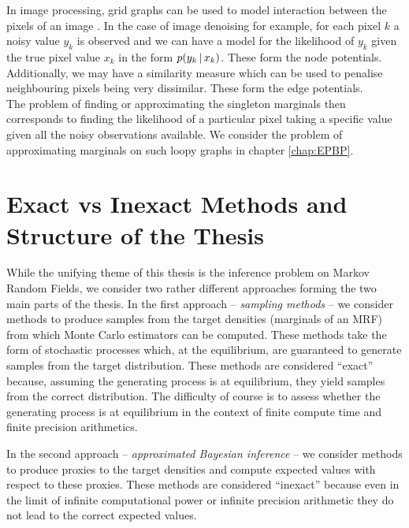In image processing, grid graphs can be used to model interaction between the pixels of an image  \citep{blake11}. 
In the case of image denoising for example, for each pixel $k$ a noisy value $y_k$ is observed and we can have a model for the likelihood of $y_k$ given the true pixel value $x_k$ in the form $p(y_k\,|\, x_k)$. These  form the node potentials. 
Additionally, we may have a similarity measure which can be used to penalise neighbouring pixels being very dissimilar. These form the edge potentials.\\
The problem of finding or approximating the singleton marginals then corresponds to finding the likelihood of a particular pixel taking a specific value given all the noisy observations available. We consider the problem of approximating marginals on such loopy graphs in chapter \ref{chap:EPBP}. 

\section{Exact vs Inexact Methods and Structure of the Thesis}

While the unifying theme of this thesis is the inference problem on Markov Random Fields, we consider two rather different approaches forming the two main parts of the thesis. In the first approach -- \emph{sampling methods} -- we consider methods to produce samples from the target densities (marginals of an MRF) from which Monte Carlo estimators can be computed. These methods take the form of stochastic processes which, at the equilibrium, are guaranteed to generate samples from the target distribution. These methods are considered ``exact'' because, assuming the generating process is at equilibrium, they yield samples from the correct distribution. The difficulty of course is to assess whether the generating process is at equilibrium in the context of finite compute time and finite precision arithmetics. 

In the second approach -- \emph{approximated Bayesian inference} -- we consider methods to produce proxies to the target densities and compute expected values with respect to these proxies. These methods are considered ``inexact'' because even in the limit of infinite computational power or infinite precision arithmetic they do not lead to the correct expected values. 

